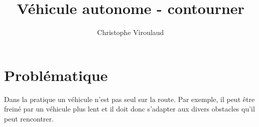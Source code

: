 \documentclass[svgnames,11pt]{beamer}
\author[]{Christophe Viroulaud}
\title{Véhicule autonome - contourner}
\date{}
\institute{Seconde SNT}
\begin{document}
\begin{frame}
\titlepage
\end{frame}
\section{Problématique}
Dans la pratique un véhicule n'est pas seul sur la route. Par exemple, il peut être freiné par un véhicule plus lent et il doit donc s'adapter aux divers obstacles qu'il peut rencontrer. 
\begin{center}
\end{center}
\end{document}

